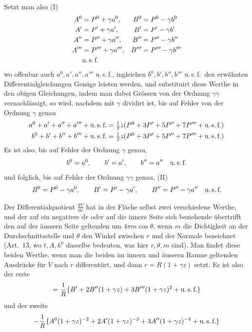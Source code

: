 Setzt man also (I)
\[
\begin{aligned}
A^0&=P^0+\gamma a^0,& B^0&=P^0-\gamma b^0\\
A'&=P'+\gamma a',& B'&=P'-\gamma b'\\
A''&=P''+\gamma a'',& B''&=P''-\gamma b''\\
A'''&=P'''+\gamma a''',& B'''&=P'''-\gamma b'''\\
&\text{u.\,s.\,f.}
\end{aligned}
\]
wo offenbar auch $a^0,a',a'',a'''$ u.\,s.\,f., ingleichen $b^0,b',b'',b'''$ u.\,s.\,f.\ den erwähnten Differentialgleichungen Genüge leisten werden, und substituirt diese Werthe in den obigen Gleichungen, indem man dabei Grössen von der Ordnung $\gamma\gamma$ vernachlässigt, so wird, nachdem mit $\gamma$ dividirt ist, bis auf Fehler von der Ordnung $\gamma$ genau
\[
\begin{aligned}
a^0+a'+a''+a'''+\text{u.\,s.\,f.}&=\tfrac12 z(P^0+3P'+5P''+7P'''+\text{u.\,s.\,f.})\\
b^0+b'+b''+b'''+\text{u.\,s.\,f.}&=\tfrac12 z(P^0+3P'+5P''+7P'''+\text{u.\,s.\,f.})
\end{aligned}
\]
Es ist also, bis auf Fehler der Ordnung $\gamma$ genau,
\[
b^0=a^0,\qquad b'=a',\qquad b''=a''\quad\text{u.\,s.\,f.}
\]
und folglich, bis auf Fehler der Ordnung $\gamma\gamma$ genau, (II)
\[
B^0=P^0-\gamma a^0,\qquad B'=P'-\gamma a',\qquad B''=P''-\gamma a''\quad\text{u.\,s.\,f.}
\]

Der Differentialquotient $\frac{\mathrm dV}{\mathrm dr}$ hat in der Fläche selbst zwei verschiedene Werthe, und der auf ein negatives $\mathrm dr$ oder auf die innere Seite sich beziehende übertrifft den auf der äussern Seite geltenden um $4\pi m\cos\theta$, wenn $m$ die Dichtigkeit an der Durchschnittsstelle und $\theta$ den Winkel zwischen $r$ und der Normale bezeichnet (Art.\ 13, wo $t,A,k^0$ dasselbe bedeuten, was hier $r,\theta,m$ sind). Man findet diese beiden Werthe, wenn man die beiden im innern und äussern Raume geltenden Ausdrücke für $V$ nach $r$ differentiirt, und dann $r=R(1+\gamma z)$ setzt. Es ist also der erste
\[
=\frac1R\{B'+2B''(1+\gamma z)+3B'''(1+\gamma z)^2+\text{u.\,s.\,f.}\}
\]
und der zweite
\[
-\frac1R\{A^0(1+\gamma z)^{-2}+2A'(1+\gamma z)^{-3}+3A''(1+\gamma z)^{-4}+\text{u.\,s.\,f.}\}
\]

